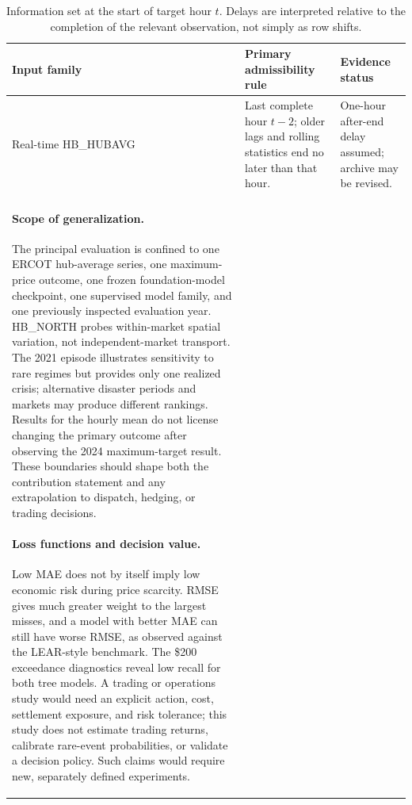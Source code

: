 \documentclass[11pt,letterpaper]{article}
\begin{document}
\begin{table}[t]
\centering\small
\caption{Information set at the start of target hour $t$. Delays are interpreted relative to the completion of the relevant observation, not simply as row shifts.}\label{tab:availability}
\begin{tabularx}{\linewidth}{@{}>{\raggedright\arraybackslash}p{2.45cm}>{\raggedright\arraybackslash}X>{\raggedright\arraybackslash}p{2.45cm}@{}}
\toprule
Input family & Primary admissibility rule & Evidence status \\
\midrule
Real-time HB\_HUBAVG & Last complete hour $t-2$; older lags and rolling statistics end no later than that hour. & One-hour after-end delay assumed; archive may be revised. \\
\paragraph{Scope of generalization.} The principal evaluation is confined to one ERCOT hub-average series, one maximum-price outcome, one frozen foundation-model checkpoint, one supervised model family, and one previously inspected evaluation year. HB\_NORTH probes within-market spatial variation, not independent-market transport. The 2021 episode illustrates sensitivity to rare regimes but provides only one realized crisis; alternative disaster periods and markets may produce different rankings. Results for the hourly mean do not license changing the primary outcome after observing the 2024 maximum-target result. These boundaries should shape both the contribution statement and any extrapolation to dispatch, hedging, or trading decisions.

\paragraph{Loss functions and decision value.} Low MAE does not by itself imply low economic risk during price scarcity. RMSE gives much greater weight to the largest misses, and a model with better MAE can still have worse RMSE, as observed against the LEAR-style benchmark. The \$200 exceedance diagnostics reveal low recall for both tree models. A trading or operations study would need an explicit action, cost, settlement exposure, and risk tolerance; this study does not estimate trading returns, calibrate rare-event probabilities, or validate a decision policy. Such claims would require new, separately defined experiments.


\end{tabularx}
\end{table}
\end{document}
